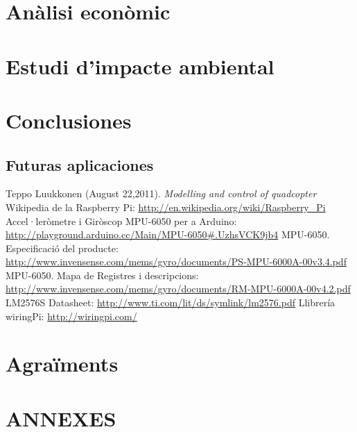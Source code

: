 \documentclass[twoside]{article}
\begin{document}

\newpage
\section{Anàlisi econòmic} \label{economics}
\newpage

\section{Estudi d'impacte ambiental} \label{impacto}
\newpage

\section{Conclusiones} \label{conclusiones}
\subsection*{Futuras aplicaciones}
\newpage

\begin{thebibliography}{99}
 Teppo Luukkonen (August 22,2011). \textit{Modelling and control of quadcopter}
 Wikipedia de la Raspberry Pi: \url{http://en.wikipedia.org/wiki/Raspberry_Pi}
 Accel·leròmetre i Giròscop MPU-6050 per a Arduino: \url{http://playground.arduino.cc/Main/MPU-6050#.UzhsVCK9jb4}
 MPU-6050. Especificació del producte: \url{http://www.invensense.com/mems/gyro/documents/PS-MPU-6000A-00v3.4.pdf}
 MPU-6050. Mapa de Registres i descripcions: \url{http://www.invensense.com/mems/gyro/documents/RM-MPU-6000A-00v4.2.pdf}
 LM2576S Datasheet: \url{http://www.ti.com/lit/ds/symlink/lm2576.pdf}
 Llibrería wiringPi: \url{http://wiringpi.com/}
\end{thebibliography}{}
\newpage

\section*{Agraïments}
\newpage

\section*{ANNEXES}
\end{document}
